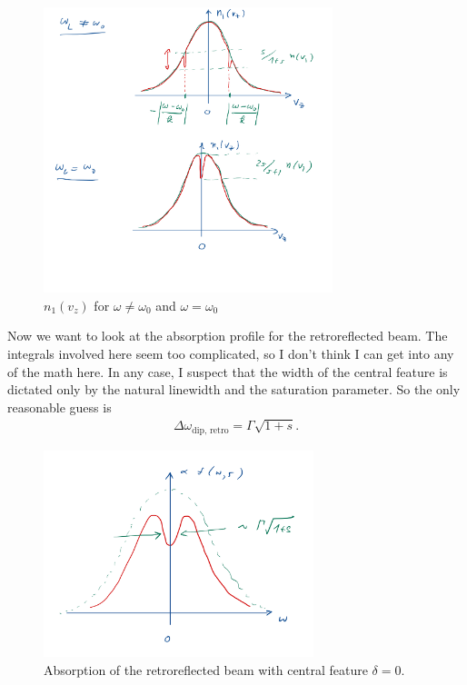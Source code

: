 \documentclass{article}
\theoremstyle{definition}
\begin{document}
\begin{enumerate}[label = (\alph*)]
\begin{enumerate}[label=(\roman*)]
		
		\begin{figure}[!htb]
			\centering
			\includegraphics[width=0.75\textwidth]{2dii_1}
			\caption{$n_1(v_z)$ for $\omega \neq \omega_0$ and $\omega = \omega_0$}
		\end{figure}
		
		
		Now we want to look at the absorption profile for the retroreflected beam. The integrals involved here seem too complicated, so I don't think I can get into any of the math here. In any case, I suspect that the width of the central feature is dictated only by the natural linewidth and the saturation parameter. So the only reasonable guess is 
		\begin{align*}
		\Delta \omega_{\text{dip, retro}} = \Gamma\sqrt{1+s}.
		\end{align*}
		
		
		\begin{figure}[!htb]
			\centering
			\includegraphics[width=0.7\textwidth]{2dii_2}
			\caption{Absorption of the retroreflected beam with central feature $\delta = 0$. }
		\end{figure}
		
		
	\end{enumerate}
\end{enumerate}
	
	
\end{document}
